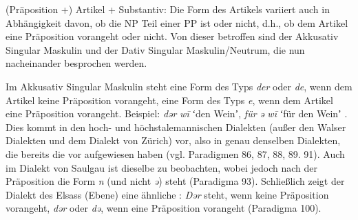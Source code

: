 {(Präposition +) Artikel + Substantiv}: Die Form des Artikels variiert auch in Abhängigkeit davon, ob die NP Teil einer PP ist oder nicht, d.h., ob dem Artikel eine Präposition vorangeht oder nicht. Von dieser  betroffen sind der Akkusativ Singular Maskulin und der Dativ Singular Maskulin/Neutrum, die nun nacheinander besprochen werden.

Im Akkusativ Singular Maskulin steht eine Form des Typs \textit{der} oder \textit{de}, wenn dem Artikel keine Präposition vorangeht, eine Form des Typs \textit{e}, wenn dem Artikel eine Präposition vorangeht. Beispiel: \textit{dər} \textit{w\=i} ʻden Weinʼ, \textit{für} \textit{ə} \textit{w\=i} ʻfür den Weinʼ \citep[283]{Stucki1917}. Dies kommt in den hoch- und höchstalemannischen Dialekten (außer den Walser Dialekten und dem Dialekt von Zürich) vor, also in genau denselben Dialekten, die bereits die  vor  aufgewiesen haben (vgl. Paradigmen 86, 87, 88, 89. 91). Auch im Dialekt von Saulgau ist dieselbe  zu beobachten, wobei jedoch nach der Präposition die Form \textit{n} (und nicht \textit{ə}) steht (Paradigma 93). Schließlich zeigt der Dialekt des Elsass (Ebene) eine ähnliche : \textit{Dər} steht, wenn keine Präposition vorangeht, \textit{dər} oder \textit{də}, wenn eine Präposition vorangeht (Paradigma 100).

